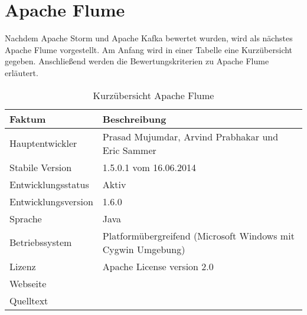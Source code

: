 \section{Apache Flume}

Nachdem Apache Storm und Apache Kafka bewertet wurden, wird als nächstes Apache Flume vorgestellt. Am Anfang wird in einer Tabelle eine Kurzübersicht gegeben. Anschließend werden die Bewertungskriterien zu Apache Flume erläutert.

\begin{table}[htbp]
	\centering
		\begin{tabular}{@{}ll@{}} \toprule
			\textbf{Faktum} & \textbf{Beschreibung} \\ \midrule
			Hauptentwickler & Prasad Mujumdar, Arvind Prabhakar und Eric Sammer \\
			Stabile Version & 1.5.0.1 vom 16.06.2014 \\ 
			Entwicklungsstatus &  Aktiv \\
			Entwicklungsversion & 1.6.0 \\
			Sprache & Java \\
			Betriebssystem & Platformübergreifend (Microsoft Windows mit Cygwin Umgebung) \\
			Lizenz & Apache License version 2.0 \\
			Webseite & \citeint{flume:home} \\
			Quelltext & \citeint{flume:GitHubApacheMirror} \\			
			\bottomrule			
		\end{tabular}
	\caption{Kurzübersicht Apache Flume}
	\label{tab:vorflume}
\end{table}

